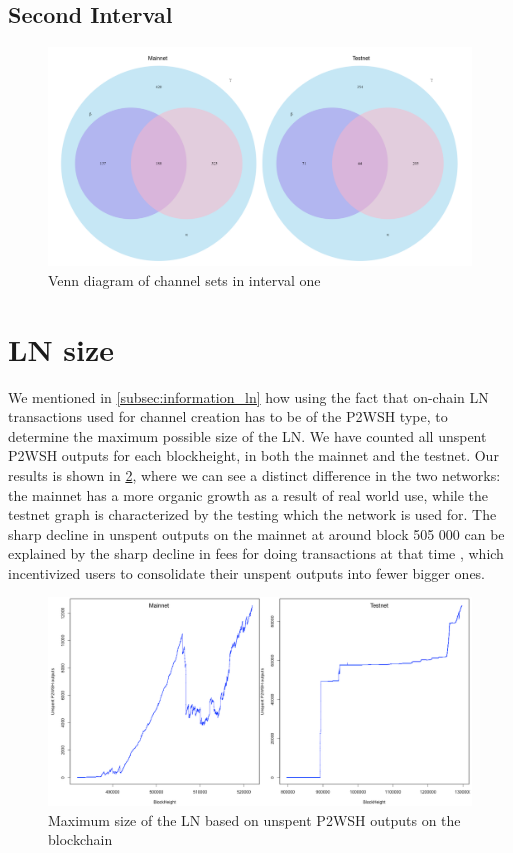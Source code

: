 \subsection{Second Interval}

\begin{figure}[h]
    \centering
    \includegraphics[width=16cm]{figures/graphs/venn_full1.png}
    \caption{Venn diagram of channel sets in interval one}
    \label{fig:venn_run2}
\end{figure}

\section{LN size}

We mentioned in \cref{subsec:information_ln} how using the fact that on-chain LN transactions used for channel creation has to be of the P2WSH type, to determine the maximum possible size of the LN. We have counted all unspent P2WSH outputs for each blockheight, in both the mainnet and the testnet. Our results is shown in \cref{fig:ln_size}, where we can see a distinct difference in the two networks: the mainnet has a more organic growth as a result of real world use, while the testnet graph is characterized by the testing which the network is used for. The sharp decline in unspent outputs on the mainnet at around block 505 000 can be explained by the sharp decline in fees for doing transactions at that time \cite{mempool_stats}, which incentivized users to consolidate their unspent outputs into fewer bigger ones. 

\begin{figure}[h]
    \centering
    \includegraphics[width=16cm]{figures/graphs/ln_size_bc.png}
    \caption{Maximum size of the LN based on unspent P2WSH outputs on the blockchain}
    \label{fig:ln_size}
\end{figure}

